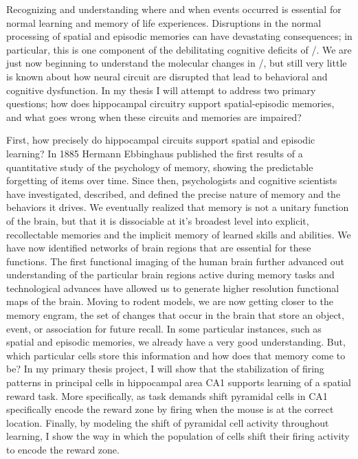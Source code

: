 \acresetall
Recognizing and understanding where and when events occurred is essential for normal learning and memory of life experiences.
Disruptions in the normal processing of spatial and episodic memories can have devastating consequences; in particular, this is one component of the debilitating cognitive deficits of \scz/.
We are just now beginning to understand the molecular changes in \scz/, but still very little is known about how neural circuit are disrupted that lead to behavioral and cognitive dysfunction.
In my thesis I will attempt to address two primary questions; how does hippocampal circuitry support spatial-episodic memories, and what goes wrong when these circuits and memories are impaired?

First, how precisely do hippocampal circuits support spatial and episodic learning?
In 1885 Hermann Ebbinghaus published the first results of a quantitative study of the psychology of memory, showing the predictable forgetting of items over time.
Since then, psychologists and cognitive scientists have investigated, described, and defined the precise nature of memory and the behaviors it drives.
We eventually realized that memory is not a unitary function of the brain, but that it is dissociable at it's broadest level into explicit, recollectable memories and the implicit memory of learned skills and abilities.
We have now identified networks of brain regions that are essential for these functions.
The first functional imaging of the human brain further advanced out understanding of the particular brain regions active during memory tasks and technological advances have allowed us to generate higher resolution functional maps of the brain.
Moving to rodent models, we are now getting closer to the memory engram, the set of changes that occur in the brain that store an object, event, or association for future recall.
In some particular instances, such as spatial and episodic memories, we already have a very good understanding. But, which particular cells store this information and how does that memory come to be?
In my primary thesis project, I will show that the stabilization of firing patterns in principal cells in hippocampal area CA1 supports learning of a spatial reward task.
More specifically, as task demands shift pyramidal cells in CA1 specifically encode the reward zone by firing when the mouse is at the correct location.
Finally, by modeling the shift of pyramidal cell activity throughout learning, I show the way in which the population of cells shift their firing activity to encode the reward zone.

